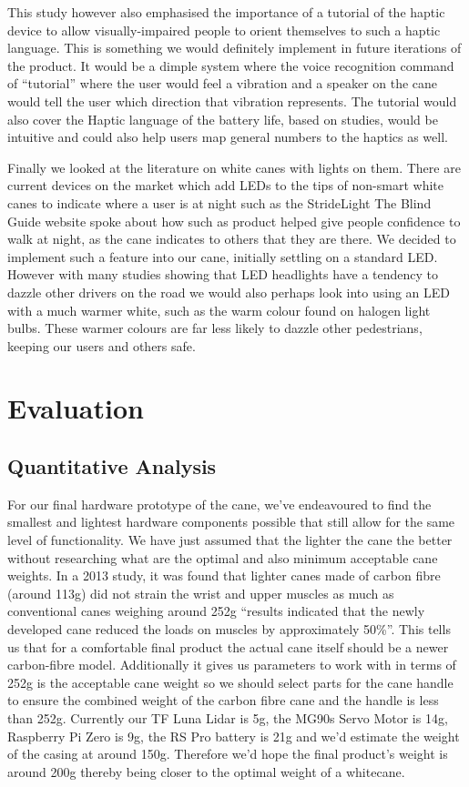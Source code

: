 \documentclass{article}
\begin{document}
This study however also emphasised the importance of a tutorial of the haptic device to allow visually-impaired people to orient themselves to such a haptic language. This is something we would definitely implement in future iterations of the product. It would be a dimple system where the voice recognition command of “tutorial” where the user would feel a vibration and a speaker on the cane would tell the user which direction that vibration represents. The tutorial would also cover the Haptic language of the battery life, based on studies, would be intuitive and could also help users map general numbers to the haptics as well.
 
Finally we looked at the literature on white canes with lights on them. There are current devices on the market which add LEDs to the tips of non-smart white canes to indicate where a user is at night such as the StrideLight The Blind Guide website spoke about how such as product helped give people confidence to walk at night, as the cane indicates to others that they are there. \cite{11henkler} We decided to implement such a feature into our cane, initially settling on a standard LED. However with many studies showing that LED headlights have a tendency to dazzle other drivers on the road  we would also perhaps look into using an LED with a much warmer white, such as the warm colour found on halogen light bulbs. \cite{12marshall} These warmer colours are far less likely to dazzle other pedestrians, keeping our users and others safe.

\section{Evaluation}

\subsection{Quantitative Analysis}

For our final hardware prototype of the cane, we’ve endeavoured to find the smallest and lightest hardware components possible that still allow for the same level of functionality. We have just assumed that the lighter the cane the better without researching what are the optimal and also minimum acceptable cane weights. In a 2013 study, it was found that lighter canes made of carbon fibre (around 113g) did not strain the wrist and upper muscles as much as conventional canes weighing around 252g “results indicated that the newly developed cane reduced the loads on muscles by approximately 50\%”. \cite{13doi} This tells us that for a comfortable final product the actual cane itself should be a newer carbon-fibre model. Additionally it gives us parameters to work with in terms of 252g is the acceptable cane weight so we should select parts for the cane handle to ensure the combined weight of the carbon fibre cane and the handle is less than 252g. Currently our TF Luna Lidar is 5g, the MG90s Servo Motor is 14g, Raspberry Pi Zero is 9g, the RS Pro battery is 21g and we’d estimate the weight of the casing at around 150g. Therefore we’d hope the final product’s weight is around 200g thereby being closer to the optimal weight of a whitecane.
 
\end{document}
